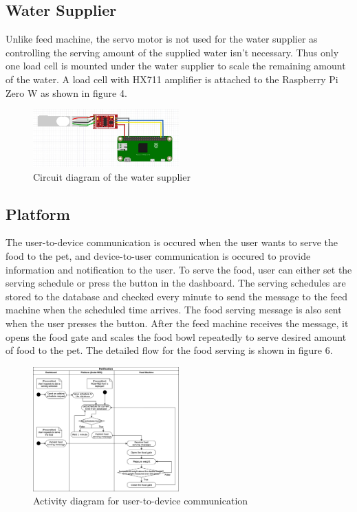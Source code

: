 \documentclass[conference]{IEEEtran}
\begin{document}
\subsection{Water Supplier}
Unlike feed machine, the servo motor is not used for the water supplier as controlling the serving amount of the supplied water isn’t necessary. Thus only one load cell is mounted under the water supplier to scale the remaining amount of the water. A load cell with HX711 amplifier is attached to the Raspberry Pi Zero W as shown in figure 4.

\begin{figure}[htbp]
\centerline{\includegraphics[width=0.5\textwidth]{./images/water supplier circuit.jpg}}
\caption{Circuit diagram of the water supplier}
\label{fig}
\end{figure}

\subsection{Platform}
The user-to-device communication is occured when the user wants to serve the food to the pet, and device-to-user communication is occured to provide information and notification to the user. To serve the food, user can either set the serving schedule or press the button in the dashboard. The serving schedules are stored to the database and checked every minute to send the message to the feed machine when the scheduled time arrives. The food serving message is also sent when the user presses the button. After the feed machine receives the message, it opens the food gate and scales the food bowl repeatedly to serve desired amount of food to the pet. The detailed flow for the food serving is shown in figure 6.

\begin{figure}[htbp]
\centerline{\includegraphics[width=0.5\textwidth]{./images/user2device.png}}
\caption{Activity diagram for user-to-device communication}
\label{fig}
\end{figure}
\end{document}
